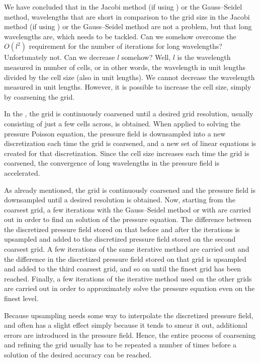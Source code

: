 We have concluded that in the Jacobi method (if using \SOR) or the Gauss--Seidel method, wavelengths that are short in comparison to the grid size in the Jacobi method (if using \SOR) or the Gauss--Seidel method are not a problem, but that long wavelengths are, which needs to be tackled. Can we somehow overcome the $O(l^2)$ requirement for the number of iterations for long wavelengths? Unfortunately not. Can we decrease $l$ somehow? Well, $l$ is the wavelength measured in number of cells, or in other words, the wavelength in unit lengths divided by the cell size (also in unit lengths). We cannot decrease the wavelength measured in unit lengths. However, it is possible to increase the cell size, simply by coarsening the grid.

In the , the grid is continuously coarsened until a desired grid resolution, usually consisting of just a few cells across, is obtained. When applied to solving the pressure Poisson equation, the pressure field is downsampled into a new discretization each time the grid is coarsened, and a new set of linear equations is created for that discretization. Since the cell size increases each time the grid is coarsened, the convergence of long wavelengths in the pressure field is accelerated.

As already mentioned, the grid is continuously coarsened and the pressure field is downsampled until a desired resolution is obtained. Now, starting from the coarsest grid, a few iterations with the Gauss--Seidel method or with \SOR are carried out in order to find an \approximate solution of the pressure equation. The difference between the discretized pressure field stored on that before and after the iterations is upsampled and added to the discretized pressure field stored on the second coarsest grid. A few iterations of the same iterative method are carried out and the difference in the discretized pressure field stored on that grid is upsampled and added to the third coarsest grid, and so on until the finest grid has been reached. Finally, a few iterations of the iterative method used on the other grids are carried out in order to approximately solve the pressure equation even on the finest level.

Because upsampling needs some way to interpolate the discretized pressure field, and often has a slight  effect simply because it tends to smear it out, additional errors are introduced in the pressure field. Hence, the entire process of coarsening and refining the grid usually has to be repeated a number of times before a solution of the desired accuracy can be reached.

